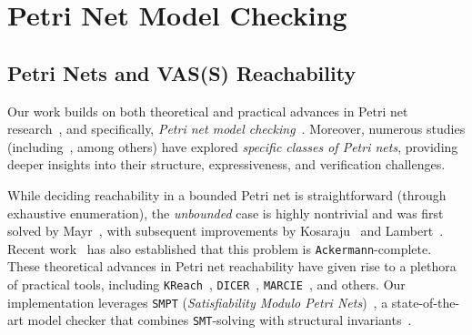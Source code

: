 \clearpage

\section{Petri Net Model Checking}
\label{appendix:smpt}


\subsection{Petri Nets and VAS(S) Reachability}
	
	Our work builds on both theoretical and practical advances in 
	Petri net research~\cite{Mu89,Es96,Re12,EsNi24}, and specifically, \textit{Petri net model checking}~\cite{DuLaSr25,HuScReAb17,AmBeDo14,PiHaRe20,Wo18}.
	Moreover, numerous studies (including~\cite{LiWaChSuZh02,Zu91,AkChDaJaSa17,AnPePe13}, among others) have explored \textit{specific classes of Petri nets}, providing deeper insights into their structure, expressiveness, and verification challenges.
	
	
	\medskip
	While deciding reachability in a bounded Petri net is straightforward (through exhaustive enumeration), the \textit{unbounded} case is highly nontrivial and was first solved by 
	Mayr~\cite{Ma81}, with subsequent improvements by Kosaraju~\cite{Ko82} and 
	Lambert~\cite{La92}. Recent work~\cite{CzWo22} has also established that this 
	problem is \texttt{Ackermann}-complete.
	These theoretical advances in Petri net reachability have given rise to a 
	plethora of practical tools, including \texttt{KReach}~\cite{DiLa20}, 
	\texttt{DICER}~\cite{XiZhLi21}, \texttt{MARCIE}~\cite{HeRoSc13}, and others. 
	Our implementation leverages \texttt{SMPT} (\emph{Satisfiability Modulo Petri Nets})~\cite{AmDa23}, a state-of-the-art model checker that combines \texttt{SMT}-solving with structural invariants~\cite{AmBeDa21,AmDaHu22}.
	
